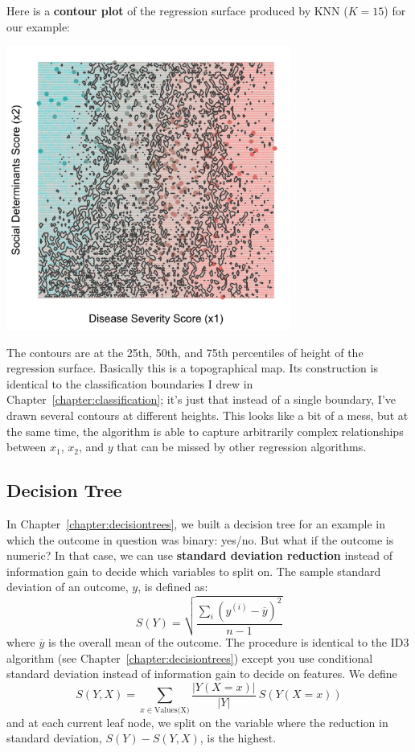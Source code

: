 Here is a \textbf{contour plot} of the regression surface produced by KNN ($K=15$) for our example:

\begin{center}
\includegraphics[width=0.7\textwidth]{img/esl-reg-knn-15.png}
\end{center}

\noindent The contours are at the 25th, 50th, and 75th percentiles of height of the regression surface. Basically this is a topographical map. Its construction is identical to the classification boundaries I drew in Chapter~\ref{chapter:classification}; it's just that instead of a single boundary, I've drawn several contours at different heights. This looks like a bit of a mess, but at the same time, the algorithm is able to capture arbitrarily complex relationships between $x_1$, $x_2$, and $y$ that can be missed by other regression algorithms.  

\subsection{Decision Tree}

In Chapter~\ref{chapter:decisiontrees}, we built a decision tree for an example in which the outcome in question was binary: yes/no. But what if the outcome is numeric? In that case, we can use \textbf{standard deviation reduction} instead of information gain to decide which variables to split on. The sample standard deviation of an outcome, $y$, is defined as:
$$ S(Y) = \sqrt{\frac{\sum_i(y^{(i)} - \overline{y})^2}{n-1}} $$
where $\overline{y}$ is the overall mean of the outcome. The procedure is identical to the ID3 algorithm (see Chapter~\ref{chapter:decisiontrees}) except you use conditional standard deviation instead of information gain to decide on features. We define
$$ S(Y, X) = \sum_{x \in \text{Values(X)}} \frac{|Y(X=x)|}{|Y|}~ S(Y(X=x)) $$
and at each current leaf node, we split on the variable where the reduction in standard deviation, $S(Y) - S(Y,X)$, is the highest.

